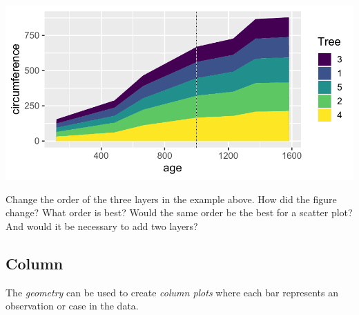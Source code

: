 \documentclass[krantz2]{krantz}\usepackage{knitr}
\begin{document}
\begin{knitrout}\footnotesize
{}\color{fgcolor}\begin{kframe}
\begin{alltt}
\hlstd{(} 
       \hlstd{(}      \hlopt{+}
  \hlstd{(} \hlstd{=} \hlstd{)} \hlopt{+}
  \hlstd{(} \hlstd{=} \hlstd{,}  \hlstd{=} \hlstd{)} \hlopt{+}
  \hlstd{(} \hlstd{=} \hlstd{,}  \hlstd{=} \hlstd{)}
\end{alltt}
\end{kframe}

{\centering \includegraphics[width=.7\textwidth]{figure/pos-area-plot-02-1} 

}



\end{knitrout}

\begin{playground}
  Change the order of the three layers in the example above. How did the figure change? What order is best? Would the same order be the best for a scatter plot? And would it be necessary to add two  layers?
\end{playground}

\subsection{Column}\label{sec:plot:col}

The \emph{geometry}  can be used to create \emph{column plots} where each bar represents an observation or case in the data.
\end{document}
